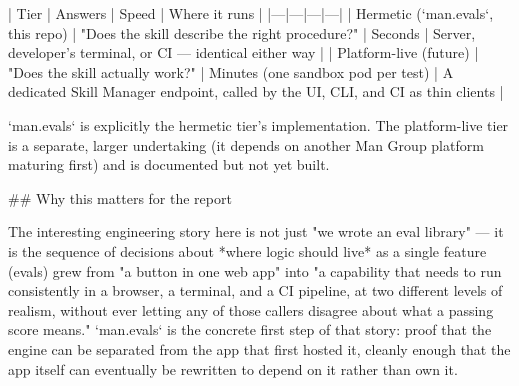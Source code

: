 | Tier | Answers | Speed | Where it runs |
|---|---|---|---|
| Hermetic (`man.evals`, this repo) | "Does the skill describe the right procedure?" | Seconds | Server, developer's terminal, or CI — identical either way |
| Platform-live (future) | "Does the skill actually work?" | Minutes (one sandbox pod per test) | A dedicated Skill Manager endpoint, called by the UI, CLI, and CI as thin clients |

`man.evals` is explicitly the hermetic tier's implementation. The platform-live tier is a separate, larger undertaking (it depends on another Man Group platform maturing first) and is documented but not yet built.

## Why this matters for the report

The interesting engineering story here is not just "we wrote an eval library" — it is the sequence of decisions about *where logic should live* as a single feature (evals) grew from "a button in one web app" into "a capability that needs to run consistently in a browser, a terminal, and a CI pipeline, at two different levels of realism, without ever letting any of those callers disagree about what a passing score means."
`man.evals` is the concrete first step of that story: proof that the engine can be separated from the app that first hosted it, cleanly enough that the app itself can eventually be rewritten to depend on it rather than own it.
